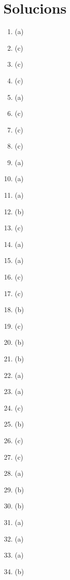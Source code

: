 \section{Solucions}
\begin{enumerate}
\item (a)
\item (c)
\item (c)
\item (c)
\item (a)
\item (c)
\item (c)
\item (c)
\item (a)
\item (a)
\item (a)
\item (b)
\item (c)
\item (a)
\item (a)
\item (c)
\item (c)
\item (b)
\item (c)
\item (b)
\item (b)
\item (a)
\item (a)
\item (c)
\item (b)
\item (c)
\item (c)
\item (a)
\item (b)
\item (b)
\item (a)
\item (a)
\item (a)
\item (b)


\end{enumerate}
